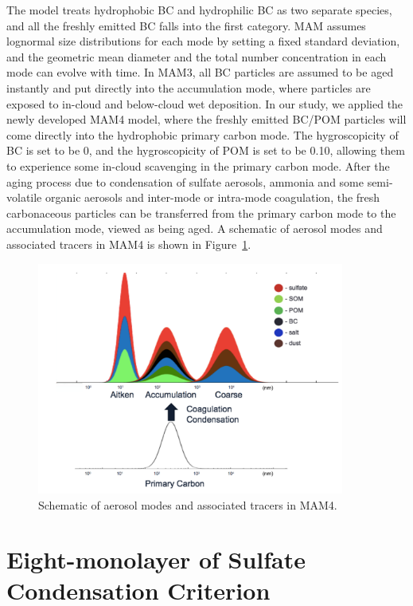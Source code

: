 \documentclass[12pt, fullpage]{uiucthesis2009_2}
\begin{document}
	
	The model treats hydrophobic BC and hydrophilic BC as two separate species, and all the freshly emitted BC falls into the first category. MAM assumes lognormal size distributions for each mode by setting a fixed standard deviation, and the geometric mean diameter and the total number concentration in each mode can evolve with time. In MAM3, all BC particles are assumed to be aged instantly and put directly into the accumulation mode, where particles are exposed to in-cloud and below-cloud wet deposition. In our study, we applied the newly developed MAM4 model, where the freshly emitted BC/POM particles will come directly into the hydrophobic primary carbon mode. The hygroscopicity of BC is set to be 0, and the hygroscopicity of POM is set to be 0.10, allowing them to experience some in-cloud scavenging in the primary carbon mode. After the aging process due to condensation of sulfate aerosols, ammonia and some semi-volatile organic aerosols and inter-mode or intra-mode coagulation, the fresh carbonaceous particles can be transferred from the primary carbon mode to the accumulation mode, viewed as being aged. A schematic of aerosol modes and associated tracers in MAM4 is shown in Figure~\ref{fig_P1}.
	\begin{figure}[h] 
		\begin{center}
			\includegraphics[width = 0.9\textwidth]{Figure01}
			\caption[Schematic of aerosol modes and associated tracers in MAM4]{\label{fig_P1} Schematic of aerosol modes and associated tracers in MAM4.}
		\end{center}
	\end{figure}
	
	
	\section{Eight-monolayer of Sulfate Condensation Criterion}\label{sec_2}
		
\end{document}
